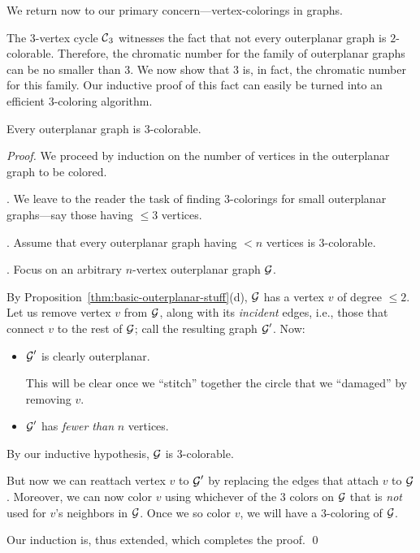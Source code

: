 \medskip

We return now to our primary concern---vertex-colorings in graphs.

\medskip

The $3$-vertex cycle $\mbox{$\cal C$}_3$ witnesses the fact that not every outerplanar graph is $2$-colorable. Therefore, the chromatic number for the family of outerplanar graphs can be no smaller than $3$.  We now show that $3$ is, in fact, the chromatic number for this family.  Our inductive proof of this fact can easily be turned into an efficient $3$-coloring algorithm.

\begin{prop}
\label{thm:OP-3-colorability}
Every outerplanar graph is $3$-colorable.
\end{prop}

\begin{proof}
We proceed by induction on the number of vertices in the outerplanar graph to be colored.

\smallskip

.
We leave to the reader the task of finding $3$-colorings for small outerplanar graphs---say those having $\leq 3$ vertices.

\medskip

.
Assume that every outerplanar graph having $< n$ vertices is $3$-colorable.

\medskip

.
Focus on an arbitrary $n$-vertex outerplanar graph $\mbox{$\cal G$}$.

\smallskip


By Proposition~\ref{thm:basic-outerplanar-stuff}(d), $\mbox{$\cal G$}$ has a vertex $v$ of degree $\leq 2$.  Let us remove vertex $v$ from $\mbox{$\cal G$}$, along with its {\it incident} edges, i.e., those that connect $v$ to the rest of $\mbox{$\cal G$}$; call the resulting graph $\mbox{$\cal G$}'$.  Now: 
\begin{itemize}
\item
$\mbox{$\cal G$}'$ is clearly outerplanar.

\smallskip

This will be clear once we ``stitch'' together the circle that we ``damaged'' by removing $v$.
\item
$\mbox{$\cal G$}'$ has {\em fewer than} $n$ vertices.
\end{itemize}
By our inductive hypothesis, $\mbox{$\cal G$}$ is $3$-colorable.

\smallskip

But now we can reattach vertex $v$ to $\mbox{$\cal G$}'$ by replacing the edges that attach $v$ to $\mbox{$\cal G$}$. Moreover, we can now color $v$ using whichever of the $3$ colors on $\mbox{$\cal G$}$ that is {\em not} used for $v$'s neighbors in $\mbox{$\cal G$}$.  Once we so color $v$, we will have a $3$-coloring of $\mbox{$\cal G$}$.

\smallskip

Our induction is, thus extended, which completes the proof.  \qed
\end{proof}


